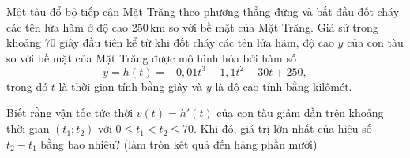 \begin{ex}
Một tàu đổ bộ tiếp cận Mặt Trăng theo phương thẳng đứng và bắt đầu đốt cháy các tên lửa hãm ở độ cao $250\,\mathrm{km}$ so với bề mặt của Mặt Trăng. Giả sử trong khoảng $70$ giây đầu tiên kể từ khi đốt cháy các tên lửa hãm, độ cao $y$ của con tàu so với bề mặt của Mặt Trăng được mô hình hóa bởi hàm số
\[y=h(t)=-0{,}01t^3+1{,}1t^2-30t+250,\]
trong đó $t$ là thời gian tính bằng giây và $y$ là độ cao tính bằng kilômét.

Biết rằng vận tốc tức thời $v(t)=h'(t)$ của con tàu giảm dần trên khoảng thời gian $(t_1;t_2)$ với $0\le t_1<t_2\le70$. Khi đó, giá trị lớn nhất của hiệu số $t_2-t_1$ bằng bao nhiêu? (làm tròn kết quả đến hàng phần mười)
\end{ex}
